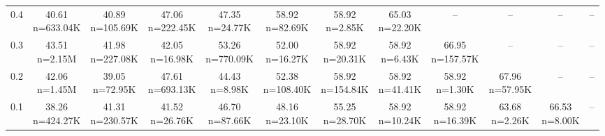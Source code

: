 \begin{table}
\begin{tabular}{lccccccccccc}
0.4 & \makecell{40.61 \\ \scriptsize n=633.04K} & \makecell{40.89 \\ \scriptsize n=105.69K} & \makecell{47.06 \\ \scriptsize n=222.45K} & \makecell{47.35 \\ \scriptsize n=24.77K} & \makecell{58.92 \\ \scriptsize n=82.69K} & \makecell{58.92 \\ \scriptsize n=2.85K} & \makecell{65.03 \\ \scriptsize n=22.20K} & -- & -- & -- & -- \\
0.3 & \makecell{43.51 \\ \scriptsize n=2.15M} & \makecell{41.98 \\ \scriptsize n=227.08K} & \makecell{42.05 \\ \scriptsize n=16.98K} & \makecell{53.26 \\ \scriptsize n=770.09K} & \makecell{52.00 \\ \scriptsize n=16.27K} & \makecell{58.92 \\ \scriptsize n=20.31K} & \makecell{58.92 \\ \scriptsize n=6.43K} & \makecell{66.95 \\ \scriptsize n=157.57K} & -- & -- & -- \\
0.2 & \makecell{42.06 \\ \scriptsize n=1.45M} & \makecell{39.05 \\ \scriptsize n=72.95K} & \makecell{47.61 \\ \scriptsize n=693.13K} & \makecell{44.43 \\ \scriptsize n=8.98K} & \makecell{52.38 \\ \scriptsize n=108.40K} & \makecell{58.92 \\ \scriptsize n=154.84K} & \makecell{58.92 \\ \scriptsize n=41.41K} & \makecell{58.92 \\ \scriptsize n=1.30K} & \makecell{67.96 \\ \scriptsize n=57.95K} & -- & -- \\
0.1 & \makecell{38.26 \\ \scriptsize n=424.27K} & \makecell{41.31 \\ \scriptsize n=230.57K} & \makecell{41.52 \\ \scriptsize n=26.76K} & \makecell{46.70 \\ \scriptsize n=87.66K} & \makecell{48.16 \\ \scriptsize n=23.10K} & \makecell{55.25 \\ \scriptsize n=28.70K} & \makecell{58.92 \\ \scriptsize n=10.24K} & \makecell{58.92 \\ \scriptsize n=16.39K} & \makecell{63.68 \\ \scriptsize n=2.26K} & \makecell{66.53 \\ \scriptsize n=8.00K} & -- \\

\end{tabular}
\end{table}
